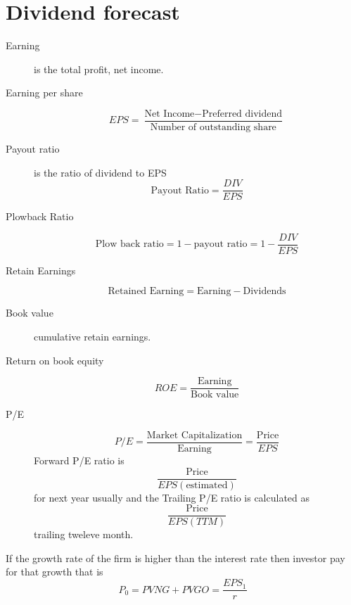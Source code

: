 \section{Dividend forecast}
\begin{description}
    \item [Earning] is the total profit, net income. 
    \item [Earning per share]
    \begin{equation*}
        EPS = \dfrac{\text{Net Income} - \text{Preferred dividend}}{\text{Number of outstanding share}}
    \end{equation*}
    \item [Payout ratio] is the ratio of dividend to EPS 
    \begin{equation*}
        \text{Payout Ratio} = \dfrac{DIV}{EPS}
    \end{equation*}
    \item[Plowback Ratio] 
    \begin{equation*}
        \text{Plow back ratio} = 1 - \text{payout ratio} = 1 - \dfrac{DIV}{EPS}
    \end{equation*} 
    \item[Retain Earnings] 
    \begin{equation*}
        \text{Retained Earning} = \text{Earning} - \text{Dividends}
    \end{equation*}
    \item[Book value] cumulative retain earnings.
    \item[Return on book equity]  
    \begin{equation*}
        ROE = \dfrac{\text{Earning}}{\text{Book value}}
    \end{equation*}
    \item[P/E] 
    \begin{equation*}
        P/E = \dfrac{\text{Market Capitalization}}{\text{Earning}} = \dfrac{\text{Price}}{EPS}
    \end{equation*}
    Forward P/E ratio is 
    \begin{equation*}
        \dfrac{\text{Price}}{EPS (\text{estimated})}
    \end{equation*}
    for next year usually and the Trailing P/E ratio is calculated as 
    \begin{equation*}
        \dfrac{\text{Price}}{EPS(TTM)}
    \end{equation*}
    trailing tweleve month. 
\end{description}
If the growth rate of the firm is higher than the interest rate then investor pay for that growth that is 
\begin{equation*}
    P_0 = PVNG + PVGO = \dfrac{EPS_1}{r}
\end{equation*}
